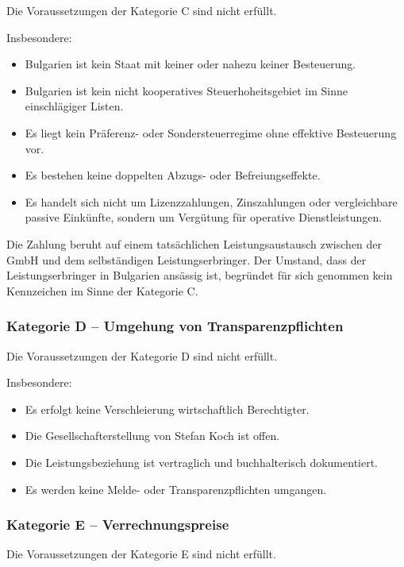 \documentclass[11pt,a4paper]{article}
\begin{document}
Die Voraussetzungen der Kategorie C sind nicht erfüllt.

Insbesondere:

\begin{itemize}
    \item Bulgarien ist kein Staat mit keiner oder nahezu keiner Besteuerung.
    \item Bulgarien ist kein nicht kooperatives Steuerhoheitsgebiet im Sinne einschlägiger Listen.
    \item Es liegt kein Präferenz- oder Sondersteuerregime ohne effektive Besteuerung vor.
    \item Es bestehen keine doppelten Abzugs- oder Befreiungseffekte.
    \item Es handelt sich nicht um Lizenzzahlungen, Zinszahlungen oder vergleichbare passive Einkünfte, sondern um Vergütung für operative Dienstleistungen.
\end{itemize}

Die Zahlung beruht auf einem tatsächlichen Leistungsaustausch zwischen der GmbH und dem selbständigen Leistungserbringer. Der Umstand, dass der Leistungserbringer in Bulgarien ansässig ist, begründet für sich genommen kein Kennzeichen im Sinne der Kategorie C.

\subsubsection*{Kategorie D -- Umgehung von Transparenzpflichten}

Die Voraussetzungen der Kategorie D sind nicht erfüllt.

Insbesondere:

\begin{itemize}
    \item Es erfolgt keine Verschleierung wirtschaftlich Berechtigter.
    \item Die Gesellschafterstellung von Stefan Koch ist offen.
    \item Die Leistungsbeziehung ist vertraglich und buchhalterisch dokumentiert.
    \item Es werden keine Melde- oder Transparenzpflichten umgangen.
\end{itemize}

\subsubsection*{Kategorie E -- Verrechnungspreise}

Die Voraussetzungen der Kategorie E sind nicht erfüllt.
\end{document}
